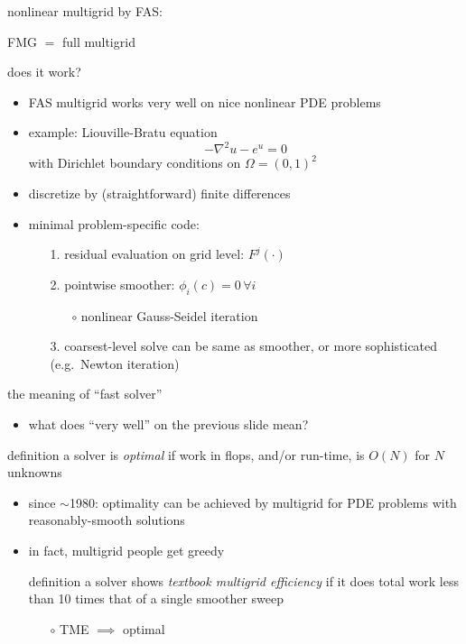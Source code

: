 \documentclass[svgnames,
               hyperref={colorlinks,citecolor=DeepPink4,linkcolor=FireBrick,urlcolor=Maroon},
               usepdftitle=false]  %
               {beamer}
\begin{document}
\begin{frame}{nonlinear multigrid by FAS: }
{\centering


FMG $=$ full multigrid

\vspace{6mm}
}
\end{frame}


\begin{frame}{does it work?}

\begin{itemize}
\item FAS multigrid works \alert{very well} on nice nonlinear PDE problems
\item example: Liouville-Bratu equation
    $$-\nabla^2 u - e^u = 0$$
with Dirichlet boundary conditions on $\Omega=(0,1)^2$
\item discretize by (straightforward) finite differences
\item minimal problem-specific code:
    \begin{enumerate}
    \item[1.] residual evaluation on grid level: $F^j(\cdot)$
    \item[2.] pointwise smoother: $\phi_i(c) = 0 \,\forall i$
        \begin{itemize}
        \item[$\circ$] nonlinear Gauss-Seidel iteration
        \end{itemize}
    \item[3.] coarsest-level solve can be same as smoother, or more sophisticated (e.g.~Newton iteration)
    \end{enumerate}
\end{itemize}
\end{frame}


\begin{frame}{the meaning of ``fast solver''}

\begin{itemize}
\item what does ``very well'' on the previous slide mean?
\end{itemize}

\begin{block}{definition} a solver is \emph{optimal} if work in flops, and/or run-time, is $O(N)$ for $N$ unknowns
\end{block}

\begin{itemize}
\item since $\sim$1980: optimality can be achieved by multigrid for PDE problems with reasonably-smooth solutions
\item in fact, multigrid people get greedy
\begin{block}{definition} a solver shows \emph{textbook multigrid efficiency} if it does total work less than 10 times that of a single smoother sweep
\end{block}
    \begin{itemize}
    \item[$\circ$] TME $\implies$ optimal
    \end{itemize}
\end{itemize}
\end{frame}
\end{document}
